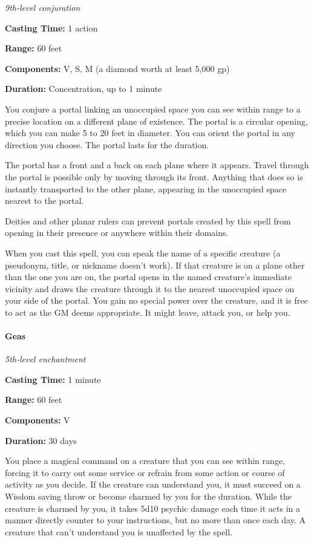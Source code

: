 \documentclass[
]{article}
\begin{document}
\emph{9th-level conjuration}

\textbf{Casting Time:} 1 action

\textbf{Range:} 60 feet

\textbf{Components:} V, S, M (a diamond worth at least 5,000 gp)

\textbf{Duration:} Concentration, up to 1 minute

You conjure a portal linking an unoccupied space you can see within
range to a precise location on a different plane of existence. The
portal is a circular opening, which you can make 5 to 20 feet in
diameter. You can orient the portal in any direction you choose. The
portal lasts for the duration.

The portal has a front and a back on each plane where it appears. Travel
through the portal is possible only by moving through its front.
Anything that does so is instantly transported to the other plane,
appearing in the unoccupied space nearest to the portal.

Deities and other planar rulers can prevent portals created by this
spell from opening in their presence or anywhere within their domains.

When you cast this spell, you can speak the name of a specific creature
(a pseudonym, title, or nickname doesn't work). If that creature is on a
plane other than the one you are on, the portal opens in the named
creature's immediate vicinity and draws the creature through it to the
nearest unoccupied space on your side of the portal. You gain no special
power over the creature, and it is free to act as the GM deems
appropriate. It might leave, attack you, or help you.

\hypertarget{geas}{%
\paragraph{Geas}\label{geas}}

\emph{5th-level enchantment}

\textbf{Casting Time:} 1 minute

\textbf{Range:} 60 feet

\textbf{Components:} V

\textbf{Duration:} 30 days

You place a magical command on a creature that you can see within range,
forcing it to carry out some service or refrain from some action or
course of activity as you decide. If the creature can understand you, it
must succeed on a Wisdom saving throw or become charmed by you for the
duration. While the creature is charmed by you, it takes 5d10 psychic
damage each time it acts in a manner directly counter to your
instructions, but no more than once each day. A creature that can't
understand you is unaffected by the spell.
\end{document}
